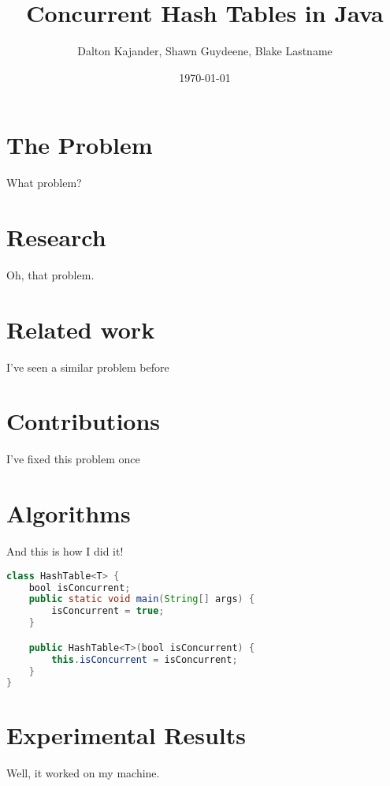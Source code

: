 \documentclass{article}
\begin{document}
\author{Dalton Kajander, Shawn Guydeene, Blake Lastname}
\title{Concurrent Hash Tables in Java}
\date{\today{}}
\maketitle

\newpage
\tableofcontents
\newpage

\section{The Problem}
What problem?

\section{Research}
Oh, that problem.

\section{Related work}
I've seen a similar problem before

\section{Contributions}
I've fixed this problem once

\section{Algorithms}
And this is how I did it!
\begin{lstlisting}[language={Java},caption=Testing surce code in \LaTeX{}.,breaklines=true,frame=single]
class HashTable<T> {
    bool isConcurrent;
    public static void main(String[] args) {
        isConcurrent = true;
    }

    public HashTable<T>(bool isConcurrent) {
        this.isConcurrent = isConcurrent;
    }
}
\end{lstlisting}

\section{Experimental Results}
Well, it worked on my machine. 
\end{document}
